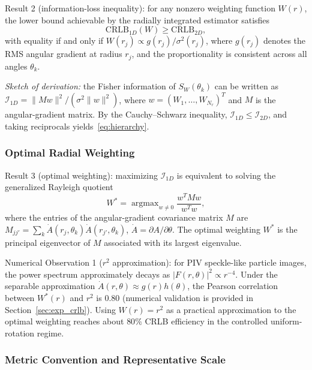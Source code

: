 \documentclass[lettersize,journal]{IEEEtran}
\newcommand{\CRLB}{\mathrm{CRLB}}
\newcommand{\bfw}{w}
\newcommand{\bfM}{M}
\begin{document}
Result 2 (information-loss inequality):
for any nonzero weighting function $W(r)$, the lower bound achievable by the radially integrated estimator satisfies
%
\begin{equation}
  \CRLB_{1D}(W) \geq \CRLB_{2D},
  \label{eq:hierarchy}
\end{equation}
%
with equality if and only if $W(r_j) \propto g(r_j)/\sigma^2(r_j)$,
where $g(r_j)$ denotes the RMS angular gradient at radius $r_j$,
and the proportionality is consistent across all angles $\theta_k$.

\textit{Sketch of derivation:}
the Fisher information of $S_W(\theta_k)$ can be written as
$\mathcal{I}_{1D} = \|\bfM\bfw\|^2 / (\sigma^2\|\bfw\|^2)$,
where $\bfw = (W_1,\ldots,W_{N_r})^T$
and $\bfM$ is the angular-gradient matrix.
By the Cauchy--Schwarz inequality,
$\mathcal{I}_{1D} \leq \mathcal{I}_{2D}$,
and taking reciprocals yields~\eqref{eq:hierarchy}.
\subsubsection{Optimal Radial Weighting}
Result 3 (optimal weighting):
maximizing $\mathcal{I}_{1D}$ is equivalent to solving the generalized Rayleigh quotient
%
\begin{equation}
  W^* = \mathop{\arg\max}_{\bfw \neq 0}
  \frac{\bfw^T \bfM \bfw}{\bfw^T \bfw},
  \label{eq:optimal_weight}
\end{equation}
%
where the entries of the angular-gradient covariance matrix $\bfM$ are
$M_{jj'} = \sum_k \dot{A}(r_j,\theta_k)\dot{A}(r_{j'},\theta_k)$,
$\dot{A} = \partial A/\partial\theta$.
The optimal weighting $W^*$ is the principal eigenvector of $\bfM$ associated with its largest eigenvalue.

Numerical Observation 1 ($r^2$ approximation):
for PIV speckle-like particle images, the power spectrum approximately decays as $|F(r,\theta)|^2 \propto r^{-4}$.
Under the separable approximation $\dot{A}(r,\theta) \approx g(r)h(\theta)$,
the Pearson correlation between $W^*(r)$ and $r^2$ is 0.80 (numerical validation is provided in Section~\ref{sec:exp_crlb}).
Using $W(r)=r^2$ as a practical approximation to the optimal weighting
reaches about $80\%$ CRLB efficiency in the controlled uniform-rotation regime.

\subsubsection{Metric Convention and Representative Scale}
\end{document}
